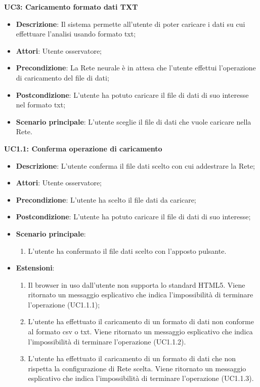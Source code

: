 \textbf{UC3: Caricamento formato dati TXT}\mbox{}
\label{UC3: Caricamento formato dati TXT}
\begin{itemize}
\item \textbf{Descrizione}: Il sistema permette all'utente di poter caricare i dati su cui effettuare l'analisi usando formato txt;
\item \textbf{Attori}: Utente osservatore;
\item \textbf{Precondizione}: La Rete neurale \`e in attesa che l'utente effettui l'operazione di caricamento del file di dati;
\item \textbf{Postcondizione}: L'utente ha potuto caricare il file di dati di suo interesse nel formato txt;
\item \textbf{Scenario principale}: L'utente sceglie il file di dati che vuole caricare nella Rete.
\end{itemize}

\textbf{UC1.1: Conferma operazione di caricamento}\mbox{}
\label{UC1.1: Conferma operazione di caricamento}
\begin{itemize}
\item \textbf{Descrizione}: L'utente conferma il file dati scelto con cui addestrare la Rete;
\item \textbf{Attori}: Utente osservatore;
\item \textbf{Precondizione}: L'utente ha scelto il file dati da caricare;
\item \textbf{Postcondizione}: L'utente ha potuto caricare il file di dati di suo interesse;
\item \textbf{Scenario principale}:
\begin{enumerate}
\item L'utente ha confermato il file dati scelto con l'apposto pulsante.
\end{enumerate}
\item \textbf{Estensioni}:
\begin{enumerate}
\item Il browser in uso dall'utente non supporta lo standard HTML5. Viene ritornato un messaggio esplicativo che indica l'impossibilit\`a di terminare l'operazione (UC1.1.1);
\item L'utente ha effettuato il caricamento di un formato di dati non conforme al formato csv o txt.  Viene ritornato un messaggio esplicativo che indica l'impossibilit\`a di terminare l'operazione (UC1.1.2).
\item L'utente ha effettuato il caricamento di un formato di dati che non rispetta la configurazione di Rete scelta.  Viene ritornato un messaggio esplicativo che indica l'impossibilit\`a di terminare l'operazione (UC1.1.3).
\end{enumerate}
\end{itemize}


